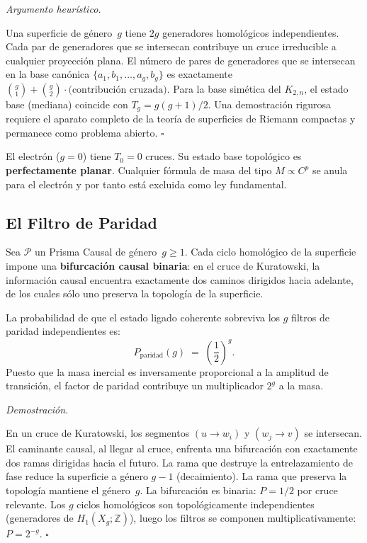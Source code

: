 \documentclass[11pt, a4paper, openany]{book}
\renewenvironment{proof}[1][Demostraci\'on]{%
  \par\noindent\textit{#1.}\quad
}{\hfill$\square$\par\medskip}
\begin{document}
\begin{proof}[Argumento heur\'istico]
Una superficie de g\'enero~$g$ tiene $2g$ generadores homol\'ogicos
independientes. Cada par de generadores que se intersecan contribuye un
cruce irreducible a cualquier proyecci\'on plana. El n\'umero de pares
de generadores que se intersecan en la base can\'onica
$\{a_1, b_1, \ldots, a_g, b_g\}$ es exactamente
$\binom{g}{1} + \binom{g}{2} \cdot \text{(contribuci\'on cruzada)}$.
Para la base sim\'etica del $K_{2,n}$, el estado base (mediana)
coincide con $T_g = g(g+1)/2$. Una demostraci\'on rigurosa requiere
el aparato completo de la teor\'ia de superficies de Riemann
compactas y permanece como problema abierto.
\end{proof}

\begin{corollary}
\label{cor:electron-planar}
El electr\'on ($g = 0$) tiene $T_0 = 0$ cruces. Su estado base
topol\'ogico es \textbf{perfectamente planar}. Cualquier f\'ormula de
masa del tipo $M \propto C^p$ se anula para el electr\'on y por tanto
est\'a excluida como ley fundamental.
\end{corollary}

\subsection{El Filtro de Paridad}

\begin{theorem}
\label{thm:parity-filter}
Sea $\mathcal{P}$ un Prisma Causal de g\'enero~$g \ge 1$. Cada ciclo
homol\'ogico de la superficie impone una \textbf{bifurcaci\'on causal
binaria}: en el cruce de Kuratowski, la informaci\'on causal encuentra
exactamente dos caminos dirigidos hacia adelante, de los cuales s\'olo
uno preserva la topolog\'ia de la superficie.

La probabilidad de que el estado ligado coherente sobreviva los $g$
filtros de paridad independientes es:
\[
  P_{\mathrm{paridad}}(g) \;=\; \left(\frac{1}{2}\right)^{\!g}.
\]
Puesto que la masa inercial es inversamente proporcional a la
amplitud de transici\'on, el factor de paridad contribuye un
multiplicador $2^g$ a la masa.
\end{theorem}

\begin{proof}
En un cruce de Kuratowski, los segmentos $(u \to w_i)$ y
$(w_j \to v)$ se intersecan. El caminante causal, al llegar al
cruce, enfrenta una bifurcaci\'on con exactamente dos ramas
dirigidas hacia el futuro. La rama que destruye la entrelazamiento de
fase reduce la superficie a g\'enero $g-1$ (decaimiento). La rama que
preserva la topolog\'ia mantiene el g\'enero~$g$. La bifurcaci\'on
es binaria: $P = 1/2$ por cruce relevante. Los $g$ ciclos
homol\'ogicos son topol\'ogicamente independientes (generadores de
$H_1(X_g; \mathbb{Z})$), luego los filtros se componen
multiplicativamente: $P = 2^{-g}$.
\end{proof}
\end{document}
